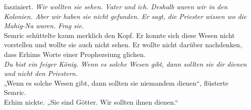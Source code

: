 fasziniert. \textit{Wir wollten sie sehen. Vater und ich. Deshalb waren wir in den Kolonien. Aber 
wir haben sie nicht gefunden. Er sagt, die Priester wissen wo die Mahig-Na waren. Frag sie.}\\
Semric schüttelte kaum merklich den Kopf. Er konnte sich diese Wesen nicht vorstellen und wollte sie 
auch nicht sehen. Er wollte nicht darüber nachdenken, dass Erhims Worte einer Prophezeiung 
glichen.\\
\textit{Du bist ein feiger König. Wenn es solche Wesen gibt, dann sollten sie dir dienen und nicht 
den Priestern.}\\
„Wenn es solche Wesen gibt, dann sollten sie niemandem dienen“, flüsterte Semric.\\
Erhim nickte. „Sie sind Götter. Wir sollten ihnen dienen.“\\


